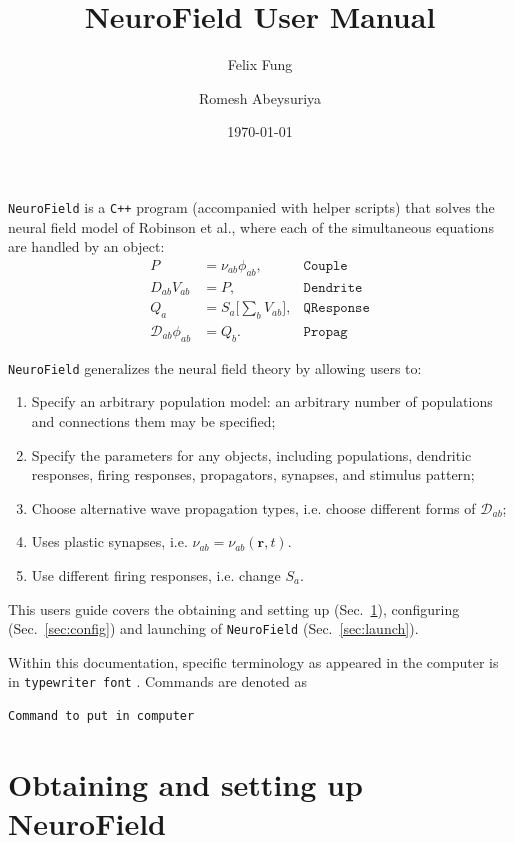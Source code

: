 \documentclass[12pt,a4paper]{article}
\title{NeuroField User Manual}
\author{Felix Fung \and Romesh Abeysuriya}
\date{\today}
\newcommand{\type}[1]{ {\small\small\tt #1} }
\newcommand{\NF}[0]{ \type{NeuroField}}
\begin{document}
\maketitle

\NF is a \type{C++} program (accompanied with helper scripts) that solves the neural field model of Robinson et al., where each of the simultaneous equations are handled by an object:
\begin{align*}
	P &= \nu_{ab}\phi_{ab}, & \mathtt{Couple}\\
	D_{ab}V_{ab} &= P, & \mathtt{Dendrite}\\
	Q_a &= S_a \big[\sum_b V_{ab} \big], & \mathtt{QResponse}\\
	\mathcal{D}_{ab}\phi_{ab} &= Q_b.&  \mathtt{Propag}
\end{align*}

\NF generalizes the neural field theory by allowing users to:
\begin{enumerate}
	\item Specify an arbitrary population model: an arbitrary number of populations and connections them may be specified;
	\item Specify the parameters for any objects, including populations, dendritic responses, firing responses, propagators, synapses, and stimulus pattern;
	\item Choose alternative wave propagation types, i.e. choose different forms of \(\mathcal{D}_{ab}\);
	\item Uses plastic synapses, i.e. \(\nu_{ab}=\nu_{ab}(\mathbf{r},t)\).
	\item Use different firing responses, i.e. change \(S_a\).
\end{enumerate}

This users guide covers the obtaining and setting up (Sec.~\ref{sec:obtain}), configuring (Sec.~\ref{sec:config}) and launching of \NF (Sec.~\ref{sec:launch}).

Within this documentation, specific terminology as appeared in the computer is in \type{typewriter font}. Commands are denoted as
\begin{lstlisting}
Command to put in computer
\end{lstlisting}

\pagebreak
\tableofcontents

\section{Obtaining and setting up NeuroField}
\label{sec:obtain}
\end{document}
